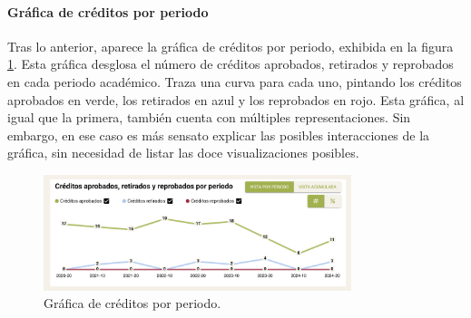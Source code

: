 \paragraph{Gráfica de créditos por periodo} Tras lo anterior, aparece la gráfica de créditos por periodo, exhibida en la figura \ref{fig:grafica_creditos}. Esta gráfica desglosa el número de créditos aprobados, retirados y reprobados en cada periodo académico. Traza una curva para cada uno, pintando los créditos aprobados en verde, los retirados en azul y los reprobados en rojo. Esta gráfica, al igual que la primera, también cuenta con múltiples representaciones. Sin embargo, en ese caso es más sensato explicar las posibles interacciones de la gráfica, sin necesidad de listar las doce visualizaciones posibles.

\begin{figure}[H]
	\centering
	\includegraphics[width=0.8\textwidth]{assets/nes/grafica_creditos.png}
	\caption{Gráfica de créditos por periodo.}
	\label{fig:grafica_creditos}
\end{figure}

